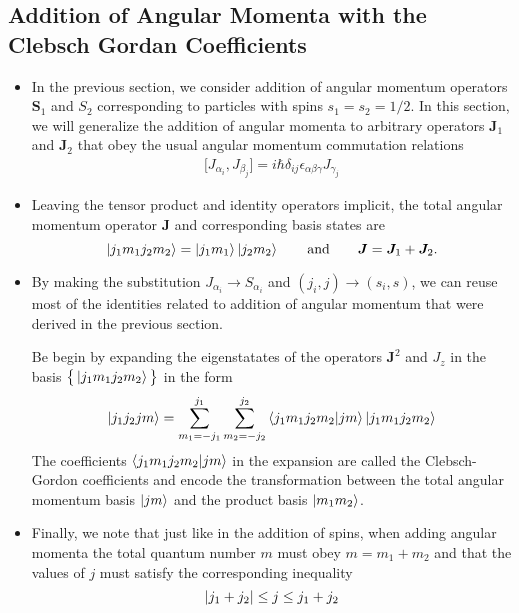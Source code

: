 \documentclass[11pt, a4paper]{article}
\renewcommand{\vec}[1]{\bm{#1}}  %
\renewcommand{\S}{\vec{S}}  %
\newcommand{\J}{\vec{J}}  %
\begin{document}
\subsection{Addition of Angular Momenta with the Clebsch Gordan Coefficients}
\begin{itemize}
    \item In the previous section, we consider addition of angular momentum operators $ \S_{1} $ and $ S_{2} $ corresponding to particles with spins $ s_{1} = s_{2} = 1/2 $. In this section, we will generalize the addition of angular momenta to arbitrary operators $ \J_{1} $ and $ \J_{2} $ that obey the usual angular momentum commutation relations
    \begin{align*}
        \big[ J_{\alpha_{i}}, J_{\beta_{j}} \big] = i \hbar \delta_{ij}\epsilon_{\alpha\beta\gamma}J_{\gamma_{j}} 
    \end{align*}
    
    \item Leaving the tensor product and identity operators implicit, the total angular momentum operator $ \J $ and corresponding basis states are
    \begin{equation*}
        \ket{j_{1}m_{1}j_{2}m_{2}} = \ket{j_{1}m_{1}}\ket{j_{2}m_{2}} \qquad \text{and} \qquad \J = \J_{1} + \J_{2}.
    \end{equation*}
    
    \item By making the substitution $ J_{\alpha_{i}} \to S_{\alpha_{i}} $ and $ (j_{i}, j) \to (s_{i}, s) $, we can reuse most of the identities related to addition of angular momentum that were derived in the previous section.

    Be begin by expanding the eigenstatates of the operators $ \J^{2} $ and $ J_{z} $ in the basis $ \big\{ \ket{j_{1}m_{1}j_{2}m_{2}} \big\} $ in the form
    \begin{equation*}
        \ket{j_{1}j_{2}jm} = \sum_{m_{1} = - j_{1}}^{j_{1}}\sum_{m_{2} = - j_{2}}^{j_{2}} \braket{j_{1}m_{1}j_{2}m_{2}}{jm} \ket{j_{1}m_{1}j_{2}m_{2}}
    \end{equation*}
    The coefficients $ \braket{j_{1}m_{1}j_{2}m_{2}}{jm} $ in the expansion are called the Clebsch-Gordon coefficients and encode the transformation between the total angular momentum basis $ \ket{jm} $ and the product basis $ \ket{m_{1}m_{2}} $. 

    \item Finally, we note that just like in the addition of spins, when adding angular momenta the total quantum number $ m $ must obey $ m = m_{1} + m_{2} $ and that the values of $ j $ must satisfy the corresponding inequality
    \begin{equation*}
        \abs{j_{1} + j_{2}} \leq j \leq j_{1} + j_{2}
    \end{equation*}

\end{itemize}
\end{document}
